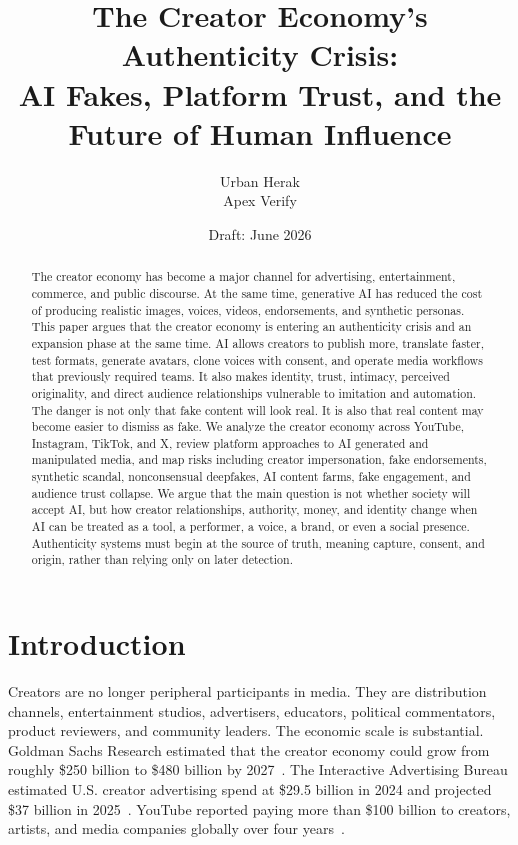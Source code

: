 \documentclass[11pt]{article}
\title{The Creator Economy's Authenticity Crisis:\\AI Fakes, Platform Trust, and the Future of Human Influence}
\author{
  Urban Herak\\
  Apex Verify
}
\date{Draft: June 2026}
\begin{document}
\maketitle

\begin{abstract}
The creator economy has become a major channel for advertising, entertainment, commerce, and public discourse. At the same time, generative AI has reduced the cost of producing realistic images, voices, videos, endorsements, and synthetic personas. This paper argues that the creator economy is entering an authenticity crisis and an expansion phase at the same time. AI allows creators to publish more, translate faster, test formats, generate avatars, clone voices with consent, and operate media workflows that previously required teams. It also makes identity, trust, intimacy, perceived originality, and direct audience relationships vulnerable to imitation and automation. The danger is not only that fake content will look real. It is also that real content may become easier to dismiss as fake. We analyze the creator economy across YouTube, Instagram, TikTok, and X, review platform approaches to AI generated and manipulated media, and map risks including creator impersonation, fake endorsements, synthetic scandal, nonconsensual deepfakes, AI content farms, fake engagement, and audience trust collapse. We argue that the main question is not whether society will accept AI, but how creator relationships, authority, money, and identity change when AI can be treated as a tool, a performer, a voice, a brand, or even a social presence. Authenticity systems must begin at the source of truth, meaning capture, consent, and origin, rather than relying only on later detection.
\end{abstract}

\section{Introduction}

Creators are no longer peripheral participants in media. They are distribution channels, entertainment studios, advertisers, educators, political commentators, product reviewers, and community leaders. The economic scale is substantial. Goldman Sachs Research estimated that the creator economy could grow from roughly \$250 billion to \$480 billion by 2027~\cite{goldman2023creator}. The Interactive Advertising Bureau estimated U.S. creator advertising spend at \$29.5 billion in 2024 and projected \$37 billion in 2025~\cite{iab2025creator}. YouTube reported paying more than \$100 billion to creators, artists, and media companies globally over four years~\cite{youtube2025made}.
\end{document}

